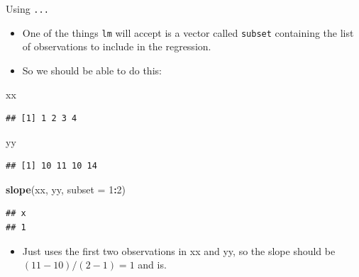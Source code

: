 \documentclass[ignorenonframetext,]{beamer}
\newenvironment{Shaded}{\begin{snugshade}}{\end{snugshade}}
\newcommand{\DataTypeTok}[1]{\textcolor[rgb]{0.13,0.29,0.53}{#1}}
\newcommand{\DecValTok}[1]{\textcolor[rgb]{0.00,0.00,0.81}{#1}}
\newcommand{\KeywordTok}[1]{\textcolor[rgb]{0.13,0.29,0.53}{\textbf{#1}}}
\newcommand{\NormalTok}[1]{#1}
\newcommand{\OperatorTok}[1]{\textcolor[rgb]{0.81,0.36,0.00}{\textbf{#1}}}
\providecommand{\tightlist}{%
  \setlength{\itemsep}{0pt}\setlength{\parskip}{0pt}}
\begin{document}
\begin{frame}[fragile]{Using \texttt{...}}
\protect\hypertarget{using-...}{}

\begin{itemize}
\tightlist
\item
  One of the things \texttt{lm} will accept is a vector called
  \texttt{subset} containing the list of observations to include in the
  regression.
\item
  So we should be able to do this:
\end{itemize}

\begin{Shaded}
\begin{Highlighting}[]
\NormalTok{xx}
\end{Highlighting}
\end{Shaded}

\begin{verbatim}
## [1] 1 2 3 4
\end{verbatim}

\begin{Shaded}
\begin{Highlighting}[]
\NormalTok{yy}
\end{Highlighting}
\end{Shaded}

\begin{verbatim}
## [1] 10 11 10 14
\end{verbatim}

\begin{Shaded}
\begin{Highlighting}[]
\KeywordTok{slope}\NormalTok{(xx, yy, }\DataTypeTok{subset =} \DecValTok{1}\OperatorTok{:}\DecValTok{2}\NormalTok{)}
\end{Highlighting}
\end{Shaded}

\begin{verbatim}
## x 
## 1
\end{verbatim}

\begin{itemize}
\tightlist
\item
  Just uses the first two observations in xx and yy, so the slope should
  be \((11 − 10)/(2 − 1) = 1\) and is.
\end{itemize}

\end{frame}
\end{document}
